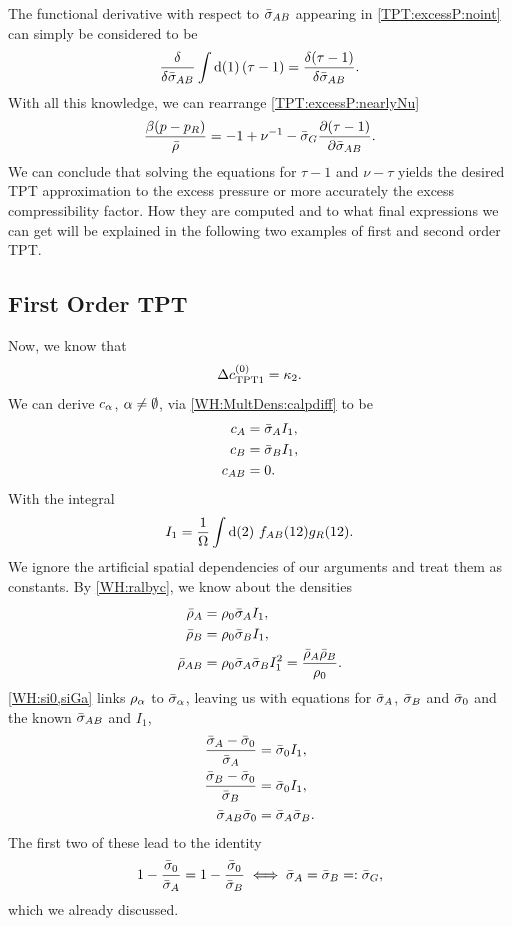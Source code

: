 \documentclass[8.5pt,twoside,twocolumn]{article}
\newcommand\di{\te{d}}
\newcommand\inon{\enmat{\int\di(1)}}
\newcommand\fab{\enmat{f_{AB}}}
\newcommand\roz{\enmat{\rho_0}}
\newcommand\ral{\enmat{\rho_{\al}}}
\newcommand\calp{\enmat{c_{\al}}}
\newcommand\sal{\enmat{\si_{\al}}}
\theoremstyle{standard}
\begin{document}
The functional derivative with respect to $\bar\sigma_{AB}$ appearing in \eqref{TPT:excessP:noint}
can simply be considered to be
\begin{equation}
\delti{}{\siab}\inon\rb{\tau-1}=\delti{\rb{\tau-1}}{\siab}.
\end{equation}
With all this knowledge, we can rearrange \eqref{TPT:excessP:nearlyNu}
\begin{equation}
\frac{\beta(p-p_R)}{\bar\rho}=-1+\nu^{-1}-\bar\sigma_G\frac {\partial{\left({\tau-1}\right)}} {\partial{\bar\sigma_{AB}}}.
\label{TPT:excessP:final}
\end{equation}
We can conclude that solving the equations for $\tau-1$ and $\nu - \tau$ yields
the desired TPT approximation to the excess pressure or more accurately the
excess compressibility factor. How they are computed and to what final expressions
we can get will be explained in the following two examples of first and second order
TPT.

\subsection{First Order TPT}
\newcommand\toc{\dc_{\te{TPT1}}}
Now, we know that
\begin{equation}
\toc=\kt.
\end{equation}
We can derive $\calp$, $\alpha\neq\emptyset$, via \eqref{WH:MultDens:calpdiff} to
be
\begin{equation}
\begin{aligned}
c_A&=\bar\sigma_A I_1, \\
c_B&=\bar\sigma_B I_1, \\
c_{AB}&=0.
\end{aligned}
\end{equation}
With the integral
\begin{equation}
I_1=\frac 1 \Om \int\di(2)\ \fab(12)g_R(12).
\end{equation}
We ignore the artificial spatial dependencies of our arguments and treat
them as constants. By \eqref{WH:ralbyc}, we know about the densities
\begin{equation}
\begin{aligned}
\tr_A&=\roz\si_A I_1, \\
\tr_B&=\roz\si_B I_1, \\
\tr_{AB}&=\roz\si_A\si_B I_1^2=\frac {\tr_A\tr_B}{\roz}.
\end{aligned}
\end{equation}
\eqref{WH:si0,siGa} links $\ral$ to $\sal$, leaving us with equations for
$\bar\sigma_A$, $\bar\sigma_B$ and $\bar\sigma_0$ and the known $\bar\sigma_{AB}$ and $I_1$,
\begin{equation}
\begin{aligned}
\frac{\bar\sigma_A-\bar\sigma_0}{\bar\sigma_A}&=\bar\sigma_0 I_1,\\
\frac{\bar\sigma_B-\bar\sigma_0}{\bar\sigma_B}&=\bar\sigma_0 I_1,\\
\bar\sigma_{AB}\bar\sigma_0&=\bar\sigma_A\bar\sigma_B.
\end{aligned}
\label{TPT1:sigmas}
\end{equation}
The first two of these lead to the identity
\begin{equation}
1-\frac{\bar\sigma_0}{\bar\sigma_A}=1-\frac{\bar\sigma_0}{\bar\sigma_B} \iff \bar\sigma_A=\bar\sigma_B=:\bar\sigma_G,
\end{equation}
which we already discussed.
\end{document}
